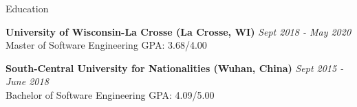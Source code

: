 \documentclass{resume} %
\begin{document}
\begin{rSection}{Education}

{\bf University of Wisconsin-La Crosse (La Crosse, WI)} \hfill {\em Sept 2018 - May 2020} 
\\ Master of Software Engineering \hfill {GPA: 3.68/4.00}

{\bf South-Central University for Nationalities (Wuhan, China)} \hfill {\em Sept 2015 - June 2018} 
\\ Bachelor of Software Engineering \hfill {GPA: 4.09/5.00}

\end{rSection}


\end{document}
